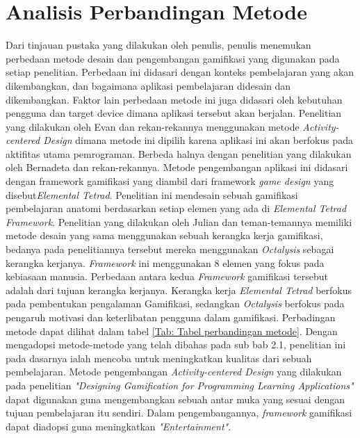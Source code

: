 \section{Analisis Perbandingan Metode}
Dari tinjauan pustaka yang dilakukan oleh penulis, penulis menemukan perbedaan metode desain dan pengembangan gamifikasi yang digunakan pada setiap penelitian.
Perbedaan ini didasari dengan konteks pembelajaran yang akan dikembangkan, dan bagaimana aplikasi pembelajaran didesain dan dikembangkan.
Faktor lain perbedaan metode ini juga didasari oleh kebutuhan pengguna dan target device dimana aplikasi tersebut akan berjalan.
Penelitian yang dilakukan oleh Evan dan rekan-rekannya menggunakan metode \textit{Activity-centered Design} dimana metode ini dipilih karena aplikasi ini akan berfokus pada aktifitas utama pemrograman.
Berbeda halnya dengan penelitian yang dilakukan oleh Bernadeta dan rekan-rekannya. Metode pengembangan aplikasi ini didasari dengan framework gamifikasi yang diambil dari framework \textit{game design} yang disebut\textit{Elemental Tetrad}.
Penelitian ini mendesain sebuah gamifikasi pembelajaran anatomi berdasarkan setiap elemen yang ada di \textit{Elemental Tetrad Framework}.
Penelitian yang dilakukan oleh Julian dan teman-temannya memiliki metode desain yang sama menggunakan sebuah kerangka kerja gamifikasi, 
bedanya  pada penelitiannya tersebut mereka menggunakan \textit{Octalysis} sebagai kerangka kerjanya. \textit{Framework} ini menggunakan 8 elemen yang fokus pada kebiasaan manusia.
Perbedaan antara kedua \textit{Framework} gamifikasi tersebut adalah dari tujuan kerangka kerjanya. Kerangka kerja \textit{Elemental Tetrad} berfokus pada pembentukan pengalaman Gamifikasi,
sedangkan \textit{Octalysis} berfokus pada pengaruh motivasi dan keterlibatan pengguna dalam gamifikasi. Perbadingan metode dapat dilihat dalam tabel \ref*{Tab: Tabel perbandingan metode}.
Dengan mengadopsi metode-metode yang telah dibahas pada sub bab 2.1, penelitian ini pada dasarnya ialah mencoba untuk meningkatkan kualitas dari sebuah pembelajaran.
Metode pengembangan \textit{Activity-centered Design} yang dilakukan pada penelitian \textit{"Designing Gamification for Programming Learning Applications"} dapat digunakan guna mengembangkan sebuah antar muka yang sesuai dengan tujuan pembelajaran itu sendiri.
Dalam pengembangannya, \textit{framework} gamifikasi dapat diadopsi guna meningkatkan \textit{"Entertainment"}. 
\newpage

